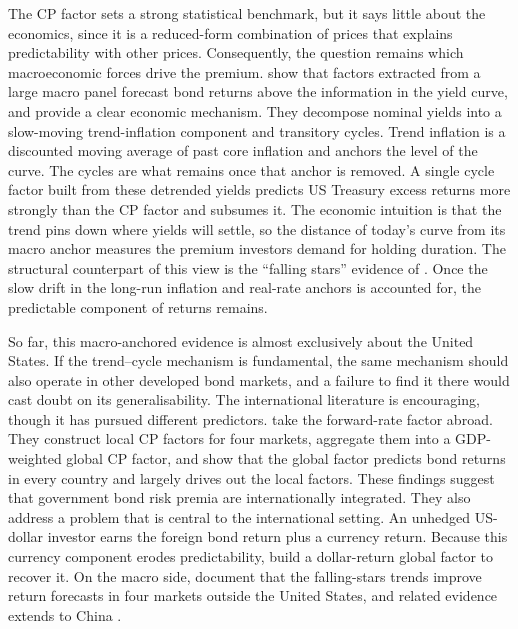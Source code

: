 The CP factor sets a strong statistical benchmark, but it says
little about the economics, since it is a reduced-form combination of prices
that explains predictability with other prices. Consequently, the question
remains which macroeconomic forces drive the premium.
\citet{ludvigson2009} show that factors extracted from a large macro panel
forecast bond returns above the information in the yield curve, and
\citet{cieslak2015} provide a clear economic mechanism. They
decompose nominal yields into a slow-moving trend-inflation component and
transitory cycles. Trend inflation is a discounted moving average of past core
inflation and anchors the level of the curve. The cycles are what remains once
that anchor is removed. A single cycle
factor built from these detrended yields predicts US Treasury excess
returns more strongly than the CP factor and subsumes it.
The economic intuition is that the trend pins down where yields will settle,
so the distance of today's curve from its macro anchor measures the premium
investors demand for holding duration. The structural counterpart of this
view is the ``falling stars'' evidence of \citet{bauer2020}. Once the slow
drift in the long-run inflation and real-rate anchors is accounted for, the predictable component of returns remains.

So far, this macro-anchored evidence is almost exclusively about
the United States. If the trend--cycle mechanism is fundamental, the same
mechanism should also operate in other developed bond markets, and a failure to
find it there would cast doubt on its generalisability. The international
literature is encouraging, though it has pursued different predictors.
\citet{dahlquist2013} take
the forward-rate factor abroad. They construct local CP factors for four
markets, aggregate them into a GDP-weighted global CP factor, and
show that the global factor predicts bond returns in every country and
largely drives out the local factors. These findings suggest that
government bond risk premia are internationally integrated. They also
address a problem that is central to the international setting. An unhedged
US-dollar investor earns the foreign bond return plus a currency
return. Because this currency component erodes predictability,
\citet{dahlquist2013} build a dollar-return global factor to recover it. On
the macro side,
\citet{zhang2021} document that the falling-stars trends improve return
forecasts in four markets outside the United States, and related evidence
extends to China \citep{zhang2022}.

